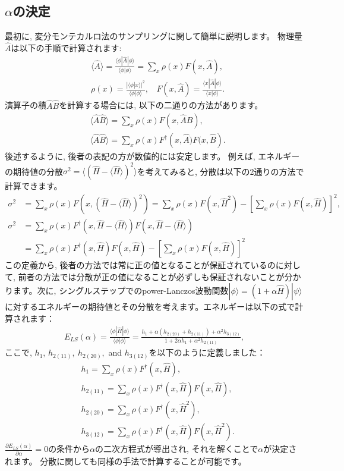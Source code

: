 \subsection{$\alpha$の決定}
最初に, 変分モンテカルロ法のサンプリングに関して簡単に説明します。
物理量$\hat{A}$は以下の手順で計算されます:
\begin{align}
&\langle \hat{A}\rangle = \frac{\langle \phi| \hat{A}|\phi \rangle}{\langle \phi| \phi \rangle} = \sum_{x} \rho(x) F(x, {\hat{A}}),\\
& \rho(x)=\frac{|\langle \phi|x\rangle|^2}{\langle \phi | \phi \rangle}, ~~~~F(x,  {\hat{A}}) =  \frac{\langle x| \hat{A}|\phi \rangle}{\langle x| \phi \rangle}.
\end{align}
演算子の積$\hat{A}\hat{B}$を計算する場合には, 以下の二通りの方法があります。
\begin{align}
&\langle \hat{A} \hat{B}\rangle = \sum_{x} \rho(x) F(x, {\hat{A}\hat{B}}),\\
&\langle \hat{A} \hat{B}\rangle = \sum_{x} \rho(x) F^{\dag}(x, {\hat{A})F(x, \hat{B}}).
\end{align}
後述するように, 後者の表記の方が数値的には安定します。
例えば, エネルギーの期待値の分散$\sigma^2=\langle (\hat{H}-\langle \hat{H}\rangle)^2\rangle$を考えてみると, 
分散は以下の2通りの方法で計算できます。
\begin{align}
\sigma^2 &=\sum_{x} \rho(x) F(x,  (\hat{H}-\langle \hat{H}\rangle)^2) = \sum_{x} \rho(x) F(x,  \hat{H}^2) - \left[ \sum_{x} \rho(x) F(x,  \hat{H})\right]^2 ,\\
\sigma^2 &=\sum_{x} \rho(x) F^{\dag}(x,  \hat{H}-\langle \hat{H}\rangle)F(x,  \hat{H}-\langle \hat{H}\rangle) \nonumber \\
&= \sum_{x} \rho(x) F^{\dag}(x,  \hat{H}) F(x, \hat{H})- \left[ \sum_{x} \rho(x) F(x,  \hat{H})\right]^2 
\end{align}
この定義から, 後者の方法では常に正の値となることが保証されているのに対して, 前者の方法では分散が正の値になることが必ずしも保証されないことが分かります。次に, シングルステップでのpower-Lanczos波動関数$|\phi\rangle =(1+\alpha \hat{H}) |\psi \rangle$に対するエネルギーの期待値とその分散を考えます。エネルギーは以下の式で計算されます：
\begin{align}
E_{LS}(\alpha) =\frac{\langle \phi| \hat{H} |\phi\rangle}{\langle \phi|\phi\rangle}=\frac{h_1 + \alpha(h_{2(20)} + h_{2(11)}) + \alpha^2 h_{3(12)}}{1 + 2\alpha h_1 + \alpha^2 h_{2(11)}},
\end{align}
ここで, $h_1$, $h_{2(11)},~h_{2(20)},$ and $h_{3(12)}$を以下のように定義しました：
\begin{align}
&h_1 =\sum_{x} \rho(x) F^{\dag}(x,  \hat{H}),\\
&h_{2(11)}=\sum_{x} \rho(x) F^{\dag}(x,  \hat{H}) F(x, \hat{H}),\\
&h_{2(20)}=\sum_{x} \rho(x) F^{\dag}(x,  \hat{H}^2),\\
&h_{3(12)}=\sum_{x} \rho(x) F^{\dag}(x,  \hat{H})F(x,  \hat{H}^2).
\end{align}
$\frac{\partial E_{LS}(\alpha)}{\partial \alpha}=0$の条件から$\alpha$の二次方程式が導出され, それを解くことで$\alpha$が決定されます。
分散に関しても同様の手法で計算することが可能です。
